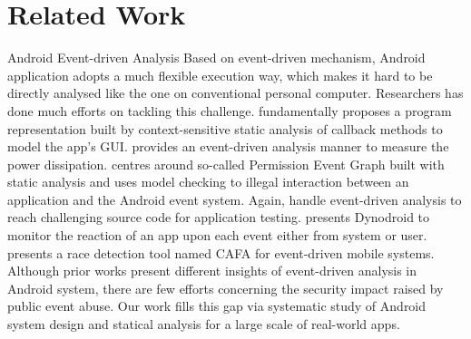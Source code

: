 \documentclass{sig-alternate-05-2015}
\begin{document}
 


\section{Related Work}

Android Event-driven Analysis
Based on event-driven mechanism, Android application adopts a much flexible execution way, which makes it hard to be directly analysed like the one on conventional personal computer. Researchers has done much efforts on tackling this challenge. \cite{yang2015static} fundamentally proposes a program representation built by context-sensitive static analysis of callback methods to model the app's GUI. \cite{kim2014fepma} provides an event-driven analysis manner to measure the power dissipation.  \cite{chen2013contextual} centres around so-called Permission Event Graph built with static analysis and uses model checking to illegal interaction between an application and the Android event system. Again, \cite{jensen2013automated} handle event-driven analysis to reach challenging source code for application testing. \cite{machiry2013dynodroid} presents Dynodroid to monitor the reaction of an app upon each event either from system or user. \cite{hsiao2014race}presents a race detection tool named CAFA for event-driven mobile systems. Although prior works present different insights of event-driven analysis in Android system, there are few efforts concerning the security impact raised by public event abuse. Our work fills this gap via systematic study of Android system design and statical analysis for a large scale of real-world apps.
\end{document}

